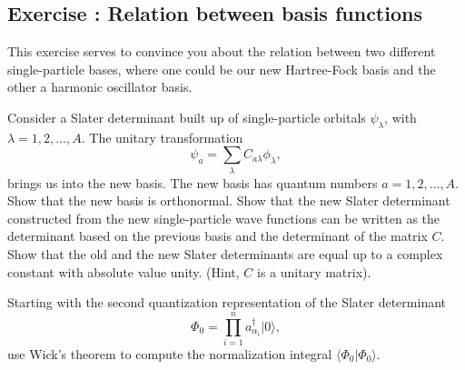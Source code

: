 \documentclass[graybox,sectrefs,envcountresetchap,open=right]{svmonodo}
\newenvironment{doconceexercise}{}{}
\newcounter{doconceexercisecounter}
\begin{document}
\begin{doconceexercise}

\subsection*{Exercise \thedoconceexercisecounter: Relation between basis functions}


This exercise serves to convince you about the relation between
two different single-particle bases, where one could be our new Hartree-Fock basis and the other a harmonic oscillator basis.

Consider a Slater determinant built up of single-particle orbitals $\psi_{\lambda}$, 
with $\lambda = 1,2,\dots,A$. The unitary transformation
\[
\psi_a  = \sum_{\lambda} C_{a\lambda}\phi_{\lambda},
\]
brings us into the new basis.  
The new basis has quantum numbers $a=1,2,\dots,A$.
Show that the new basis is orthonormal.
Show that the new Slater determinant constructed from the new single-particle wave functions can be
written as the determinant based on the previous basis and the determinant of the matrix $C$.
Show that the old and the new Slater determinants are equal up to a complex constant with absolute value unity.
(Hint, $C$ is a unitary matrix). 

Starting with the second quantization representation of the Slater determinant 
\[
\Phi_{0}=\prod_{i=1}^{n}a_{\alpha_{i}}^{\dagger}|0\rangle,
\]
use Wick's theorem to compute the normalization integral
$\langle\Phi_{0}|\Phi_{0}\rangle$.

\end{doconceexercise}
\end{document}
